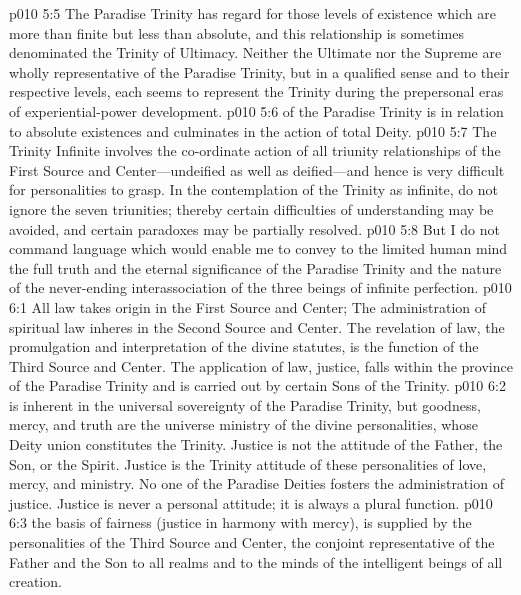 \pc \vs p010 5:5 \bibnobreakspace {} The Paradise Trinity has regard for those levels of existence which are more than finite but less than absolute, and this relationship is sometimes denominated the Trinity of Ultimacy. Neither the Ultimate nor the Supreme are wholly representative of the Paradise Trinity, but in a qualified sense and to their respective levels, each seems to represent the Trinity during the prepersonal eras of experiential\hyp{}power development.
\pc \vs p010 5:6 \bibnobreakspace {} of the Paradise Trinity is in relation to absolute existences and culminates in the action of total Deity.
\pc \vs p010 5:7 The Trinity Infinite involves the co\hyp{}ordinate action of all triunity relationships of the First Source and Center---undeified as well as deified---and hence is very difficult for personalities to grasp. In the contemplation of the Trinity as infinite, do not ignore the seven triunities; thereby certain difficulties of understanding may be avoided, and certain paradoxes may be partially resolved.
\pc \vs p010 5:8 But I do not command language which would enable me to convey to the limited human mind the full truth and the eternal significance of the Paradise Trinity and the nature of the never\hyp{}ending interassociation of the three beings of infinite perfection.\plusone
{}
\vs p010 6:1 All law takes origin in the First Source and Center;  The administration of spiritual law inheres in the Second Source and Center. The revelation of law, the promulgation and interpretation of the divine statutes, is the function of the Third Source and Center. The application of law, justice, falls within the province of the Paradise Trinity and is carried out by certain Sons of the Trinity.
\pc \vs p010 6:2  is inherent in the universal sovereignty of the Paradise Trinity, but goodness, mercy, and truth are the universe ministry of the divine personalities, whose Deity union constitutes the Trinity. Justice is not the attitude of the Father, the Son, or the Spirit. Justice is the Trinity attitude of these personalities of love, mercy, and ministry. No one of the Paradise Deities fosters the administration of justice. Justice is never a personal attitude; it is always a plural function.
\pc \vs p010 6:3  the basis of fairness (justice in harmony with mercy), is supplied by the personalities of the Third Source and Center, the conjoint representative of the Father and the Son to all realms and to the minds of the intelligent beings of all creation.
